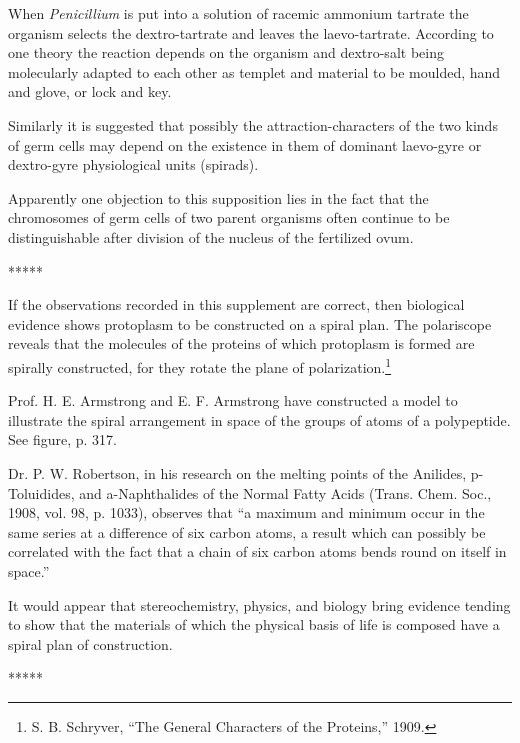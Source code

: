 \documentclass[a4paper, 12pt, oneside]{article}
\begin{document}
When \emph{Penicillium} is put into a solution of racemic ammonium tartrate the organism selects the dextro-tartrate and leaves the laevo-tartrate. According to one theory the reaction depends on the organism and dextro-salt being molecularly adapted to each other as templet and material to be moulded, hand and glove, or lock and key.

Similarly it is suggested that possibly the attraction-characters of the two kinds of germ cells may depend on the existence in them of dominant laevo-gyre or dextro-gyre physiological units (spirads).

Apparently one objection to this supposition lies in the fact that the chromosomes of germ cells of two parent organisms often continue to be distinguishable after division of the nucleus of the fertilized ovum.

\centerline{*\hspace{15mm}*\hspace{15mm}*\hspace{15mm}*\hspace{15mm}*}
\bigskip

If the observations recorded in this supplement are correct, then biological evidence shows protoplasm to be constructed on a spiral plan. The polariscope reveals that the molecules of the proteins of which protoplasm is formed are spirally constructed, for they rotate the plane of polarization.\footnote{S. B. Schryver, ``The General Characters of the Proteins,'' 1909.}

Prof. H. E. Armstrong and E. F. Armstrong have constructed a model to illustrate the spiral arrangement in space of the groups of atoms of a polypeptide. See figure, p. 317.

Dr. P. W. Robertson, in his research on the melting points of the Anilides, p-Toluidides, and a-Naphthalides of the Normal Fatty Acids (Trans. Chem. Soc., 1908, vol. 98, p. 1033), observes that ``a maximum and minimum occur in the same series at a difference of six carbon atoms, a result which can possibly be correlated with the fact that a chain of six carbon atoms bends round on itself in space.''

It would appear that stereochemistry, physics, and biology bring evidence tending to show that the materials of which the physical basis of life is composed have a spiral plan of construction.

\centerline{*\hspace{15mm}*\hspace{15mm}*\hspace{15mm}*\hspace{15mm}*}
\bigskip
\end{document}
